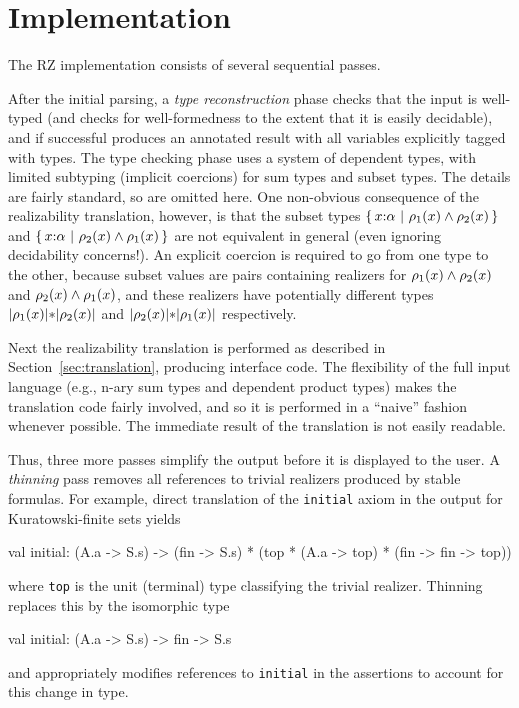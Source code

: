 \section{Implementation}
\label{sec:implementation}

The RZ implementation consists of several sequential passes.  

After the initial parsing, a \emph{type reconstruction} phase checks that the input is well-typed (and checks for well-formedness to the extent that it is easily decidable), and if successful produces an annotated result with all variables explicitly tagged with types.  The type checking phase uses a system of dependent types, with limited subtyping (implicit coercions) for sum types and subset types.  The details are fairly standard, so are omitted here.  One non-obvious consequence of the realizability translation, however, is that the subset types $\{\,x{:}\alpha\ |\ \rho_1(x)\land \rho_2(x)\,\}$ and
$\{\,x{:}\alpha\ |\ \rho_2(x)\land \rho_1(x)\,\}$ are not equivalent in general (even ignoring decidability concerns!).  An explicit coercion is required to go from one type to the other, because subset values are pairs containing realizers for $\rho_1(x)\land \rho_2(x)$ and $\rho_2(x)\land \rho_1(x)$, and these realizers have potentially different types
$|\rho_1(x)|\mathtt{*}|\rho_2(x)|$ and $|\rho_2(x)|\mathtt{*}|\rho_1(x)|$ respectively.

Next the realizability translation is performed as described in Section~\ref{sec:translation}, producing interface code.  The flexibility of the full input language (e.g., n-ary sum types and dependent product types) makes the translation code fairly involved, and so it is performed in a ``naive'' fashion whenever possible.  The immediate result of the translation is not easily readable.
 
Thus, three more passes simplify the output before it is displayed to the user.  A \emph{thinning} pass removes all references to trivial realizers produced by stable formulas.  For example,  direct translation of the \texttt{initial} axiom in the output for Kuratowski-finite sets yields
\begin{source}
val initial: (A.a -> S.s) -> (fin -> S.s) * (top * (A.a -> top) * (fin -> fin -> top))
\end{source}
where \texttt{top} is the unit (terminal) type classifying the trivial realizer.  Thinning replaces this by the isomorphic type
\begin{source}
val initial: (A.a -> S.s) -> fin -> S.s
\end{source}
and appropriately modifies references to \texttt{initial} in the assertions to account for this change in type.

